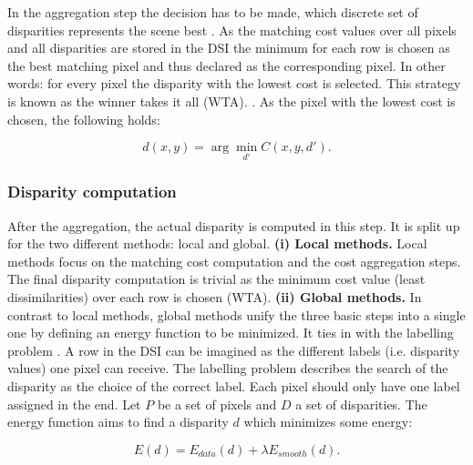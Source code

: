 In the aggregation step the decision has to be made, which discrete set of disparities represents the scene best \citep{scharstein2002taxonomy}.
As the matching cost values over all pixels and all disparities are stored in the DSI the minimum for each row is chosen as the best matching pixel and thus declared as the corresponding pixel.
In other words: for every pixel the disparity with the lowest cost is selected.
This strategy is known as the winner takes it all (WTA). \citep{cyganek2011introduction, scharstein2002taxonomy}.
As the pixel with the lowest cost is chosen, the following holds:

\begin{equation}
  d(x,y) = \arg\min_{d'} C(x,y,d').
\end{equation}

\subsubsection{Disparity computation}

After the aggregation, the actual disparity is computed in this step.
It is split up for the two different methods: local and global.
\newline\newline \noindent \textbf{(i) Local methods.} Local methods focus on the matching cost computation and the cost aggregation steps.
The final disparity computation is trivial as the minimum cost value (least dissimilarities) over each row is chosen (WTA).
\newline\newline\noindent \textbf{(ii) Global methods.} In contrast to local methods, global methods unify the three basic steps into a single one by defining an energy function to be minimized.
It ties in with the labelling problem \citep{tamassia2013handbook}.
A row in the DSI can be imagined as the different labels (i.e. disparity values) one pixel can receive.
The labelling problem describes the search of the disparity as the choice of the correct label.
Each pixel should only have one label assigned in the end.
\newline\newline\noindent Let $P$ be a set of pixels and $D$ a set of disparities. The energy function aims to find a disparity $d$ which minimizes some energy:

\begin{equation}
  E(d) = E_{data}(d) + \lambda E_{smooth}(d).
\end{equation}

